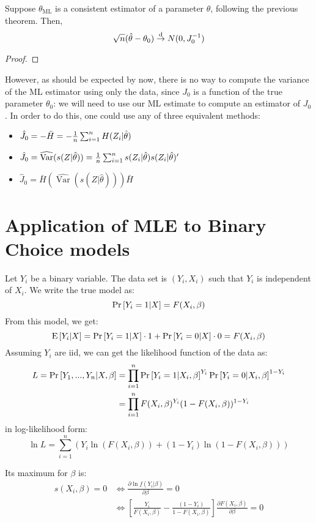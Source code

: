 \begin{theorem}
Suppose $\theta_{\text{ML}}$ is a consistent estimator of a parameter $\theta$, following the previous theorem. Then, $$\sqrt{n}(\hat\theta - \theta_0)\overset{\text{d}}{\to} N(0, J_0^{-1}) $$
\end{theorem}
\begin{proof}

\end{proof}

However, as should be expected by now, there is no way to compute the variance of the ML estimator using only the data, since $J_0$ is a function of the true parameter $\theta_0$: we will need to use our ML estimate to compute an estimator of $J_0$. In order to do this, one could use any of three equivalent methods:
\begin{itemize}
\item $\hat J_0 = - \bar H = - \frac{1}{n} \sum_{i=1}^{n} H(Z_i|\hat\theta)$
\item $\hat J_0 = \widehat{\operatorname{Var}}(s(Z|\hat\theta)) = \frac{1}{n} \sum_{i=1}^{n} s(Z_i|\hat\theta)s(Z_i|\hat\theta)'$
\item $\hat J_0 = \bar H \left(\widehat{\operatorname{Var}}(s(Z|\hat\theta))\right) \bar H $
\end{itemize}

\section{Application of MLE to Binary Choice models}

Let $Y_i$ be a binary variable. The data set is $(Y_i, X_i)$ such that $Y_i$ is independent of $X_i$. We write the true model as: $$\operatorname{Pr}\left[Y_i = 1\vert X\right] = F(X_i, \beta) $$ From this model, we get: $$\operatorname{E}\left[Y_i\vert X\right] = \operatorname{Pr}\left[Y_i = 1\vert X\right]\cdot 1 + \operatorname{Pr}\left[Y_i = 0\vert X\right] \cdot 0 = F(X_i, \beta)$$ Assuming $Y_i$ are iid, we can get the likelihood function of the data as: \begin{align*}
L = \operatorname{Pr}\left[Y_1, ..., Y_n\vert X, \beta\right] & = \prod_{i=1}^{n} \operatorname{Pr}\left[Y_i =1\vert X_i, \beta\right]^{Y_i}\operatorname{Pr}\left[Y_i=0\vert X_i, \beta\right]^{1-Y_i} \\
& = \prod_{i=1}^{n} F(X_i,\beta)^{Y_i} (1 - F(X_i,\beta))^{1 - Y_i}
\end{align*} in log-likelihood form: $$\ln L = \sum_{i=1}^{n} \left(Y_i\ln(F(X_i,\beta)) + (1-Y_i)\ln(1 - F(X_i,\beta))\right) $$ 

Its maximum for $\beta$ is: \begin{align*}
s(X_i,\beta) = 0 & \Leftrightarrow \frac{\partial \ln f(Y_i\vert\beta)}{\partial \beta} = 0 \\
&  \Leftrightarrow \left[\frac{Y_i}{F(X_i,\beta)} - \frac{(1 - Y_i)}{1 - F(X_i,\beta)}\right]\frac{\partial F(X_i,\beta)}{\partial\beta} = 0
\end{align*}

